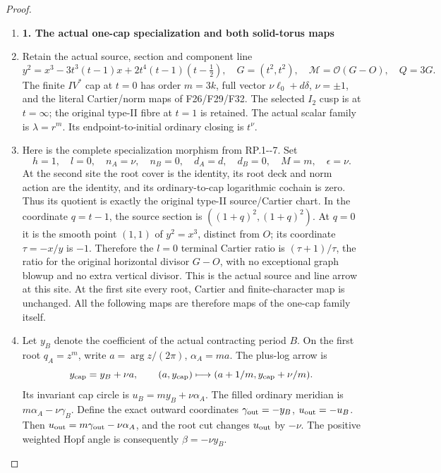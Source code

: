 \begin{proof}
\begin{enumerate}[label=\arabic*.]
\item \par

\medskip\noindent\textbf{1. The actual one-cap specialization and both solid-torus maps}

\par\nobreak

\item Retain the actual source, section and component line
\[
y^2=x^3-3t^3(t-1)x+2t^4(t-1)(t-\tfrac12),\quad
G=(t^2,t^2),\quad\mathcal M=\mathcal O(G-O),\quad Q=3G.
\]
The finite \(IV^*\) cap at \(t=0\) has order \(m=3k\),
full vector \(\nu\ell_0+d\delta\), \(\nu=\pm1\), and the literal
Cartier/norm maps of F26/F29/F32. The selected \(I_2\) cusp is at
\(t=\infty\); the original type-II fibre at \(t=1\) is retained.
The actual scalar family is \(\lambda=r^m\). Its endpoint-to-initial
ordinary closing is \(t^\nu\).

\item Here is the complete specialization morphism from RP.1-\/-7. Set
\[
h=1,\quad l=0,\quad n_A=\nu,\quad n_B=0,\quad
 d_A=d,\quad d_B=0,\quad M=m,\quad\epsilon=\nu.
\]
At the second site the root cover is the identity, its root deck and
norm action are the identity, and its ordinary-to-cap logarithmic
cochain is zero. Thus its quotient is exactly the original type-II
source/Cartier chart. In the coordinate \(q=t-1\), the source section
is \(((1+q)^2,(1+q)^2)\). At \(q=0\) it is the smooth point
\((1,1)\) of \(y^2=x^3\), distinct from \(O\); its coordinate
\(\tau=-x/y\) is \(-1\). Therefore the \(l=0\) terminal Cartier
ratio is \((\tau+1)/\tau\), the ratio for the original horizontal
divisor \(G-O\), with no exceptional graph blowup and no extra
vertical divisor. This is the actual source and line arrow at this
site. At the first site every root, Cartier and finite-character map
is unchanged. All the following maps are therefore maps of the
one-cap family itself.

\item Let \(y_B\) denote the coefficient of the actual contracting period
\(B\). On the first root \(q_A=z^m\), write
\(a=\arg z/(2\pi)\), \(\alpha_A=ma\). The plus-log arrow is
\[
y_{\rm cap}=y_B+\nu a,\qquad
(a,y_{\rm cap})\longmapsto(a+1/m,y_{\rm cap}+\nu/m).
\]
Its invariant cap circle is \(u_B=my_B+\nu\alpha_A\). The filled
ordinary meridian is \(m\alpha_A-\nu\gamma_B\). Define the exact
outward coordinates \(\gamma_{\rm out}=-y_B\),
\(u_{\rm out}=-u_B\). Then
\(u_{\rm out}=m\gamma_{\rm out}-\nu\alpha_A\), and the root cut
changes \(u_{\rm out}\) by \(-\nu\). The positive weighted Hopf
angle is consequently \(\beta=-\nu y_B\).


\end{enumerate}
\end{proof}
